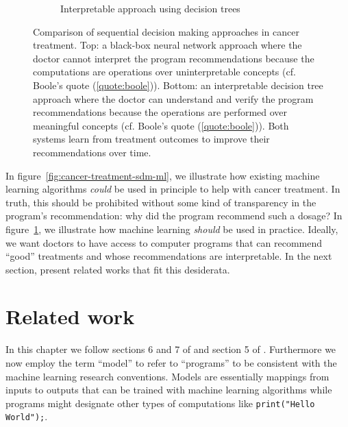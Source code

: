 \begin{figure}
\begin{subfigure}[b]{0.7\textwidth}
\begin{tikzpicture}
        \end{tikzpicture}
        \caption{Interpretable approach using decision trees}
        \label{fig:cancer-treatment-comparison}
    \end{subfigure}
    \caption{Comparison of sequential decision making approaches in cancer treatment. Top: a black-box neural network approach where the doctor cannot interpret the program recommendations because the computations are operations over uninterpretable concepts (cf. Boole's quote (\ref{quote:boole})). Bottom: an interpretable decision tree approach where the doctor can understand and verify the program recommendations because the operations are performed over meaningful concepts  (cf. Boole's quote (\ref{quote:boole})). Both systems learn from treatment outcomes to improve their recommendations over time.}
    \label{fig:cancer-treatment-comparison-combined}
\end{figure}

In figure~\ref{fig:cancer-treatment-sdm-ml}, we illustrate how existing machine learning algorithms \textit{could} be used in principle to help with cancer treatment. In truth, this should be prohibited without some kind of transparency in the program's recommendation: why did the program recommend such a dosage?
In figure~\ref{fig:cancer-treatment-comparison}, we illustrate how machine learning \textit{should} be used in practice. 
Ideally, we want doctors to have access to computer programs that can recommend ``good'' treatments and whose recommendations are interpretable. 
In the next section, present related works that fit this desiderata.

\chapter*{Related work}\label{sec:intro-interp}

In this chapter we follow sections 6 and 7 of \cite{glanois-survey} and section 5 of \cite{milani-survey}. 
Furthermore we now employ the term ``model'' to refer to ``programs'' to be consistent with the machine learning research conventions.
Models are essentially mappings from inputs to outputs that can be trained with machine learning algorithms while programs might designate other types of computations like \texttt{print("Hello World");}.

